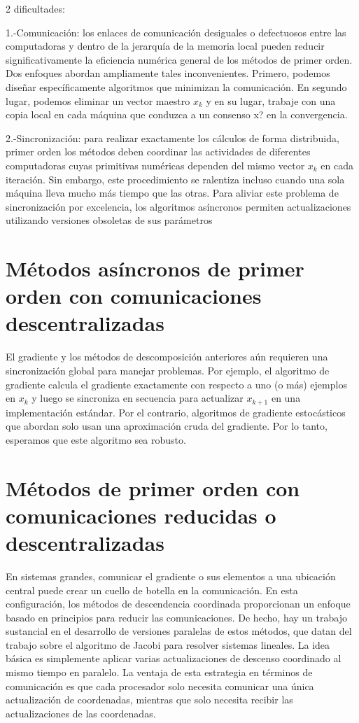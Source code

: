 \documentclass[]{article}
\begin{document}
2 dificultades:

1.-Comunicación: los enlaces de comunicación desiguales o defectuosos
entre las computadoras y dentro de la jerarquía de la memoria local
pueden reducir significativamente la eficiencia numérica general de los
métodos de primer orden. Dos enfoques abordan ampliamente tales
inconvenientes. Primero, podemos diseñar específicamente algoritmos que
minimizan la comunicación. En segundo lugar, podemos eliminar un vector
maestro \(x_k\) y en su lugar, trabaje con una copia local en cada
máquina que conduzca a un consenso x? en la convergencia.

2.-Sincronización: para realizar exactamente los cálculos de forma
distribuida, primer orden los métodos deben coordinar las actividades de
diferentes computadoras cuyas primitivas numéricas dependen del mismo
vector \(x_k\) en cada iteración. Sin embargo, este procedimiento se
ralentiza incluso cuando una sola máquina lleva mucho más tiempo que las
otras. Para aliviar este problema de sincronización por excelencia, los
algoritmos asíncronos permiten actualizaciones utilizando versiones
obsoletas de sus parámetros

\section{Métodos asíncronos de primer orden con comunicaciones
descentralizadas}\label{metodos-asincronos-de-primer-orden-con-comunicaciones-descentralizadas}

El gradiente y los métodos de descomposición anteriores aún requieren
una sincronización global para manejar problemas. Por ejemplo, el
algoritmo de gradiente calcula el gradiente exactamente con respecto a
uno (o más) ejemplos en \(x_k\) y luego se sincroniza en secuencia para
actualizar \(x_{k + 1}\) en una implementación estándar. Por el
contrario, algoritmos de gradiente estocásticos que abordan solo usan
una aproximación cruda del gradiente. Por lo tanto, esperamos que este
algoritmo sea robusto.

\section{Métodos de primer orden con comunicaciones reducidas o
descentralizadas}\label{metodos-de-primer-orden-con-comunicaciones-reducidas-o-descentralizadas}

En sistemas grandes, comunicar el gradiente o sus elementos a una
ubicación central puede crear un cuello de botella en la comunicación.
En esta configuración, los métodos de descendencia coordinada
proporcionan un enfoque basado en principios para reducir las
comunicaciones. De hecho, hay un trabajo sustancial en el desarrollo de
versiones paralelas de estos métodos, que datan del trabajo sobre el
algoritmo de Jacobi para resolver sistemas lineales. La idea básica es
simplemente aplicar varias actualizaciones de descenso coordinado al
mismo tiempo en paralelo. La ventaja de esta estrategia en términos de
comunicación es que cada procesador solo necesita comunicar una única
actualización de coordenadas, mientras que solo necesita recibir las
actualizaciones de las coordenadas.
\end{document}
